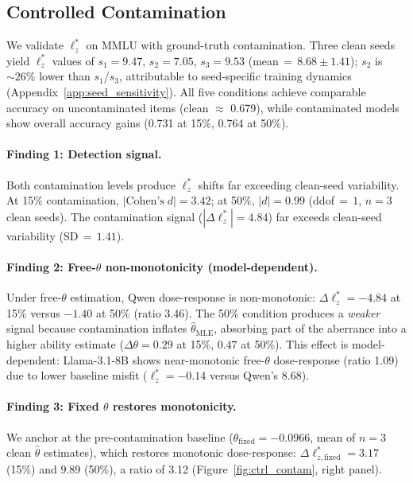 \subsection{Controlled Contamination}
\label{sec:ctrl_contam}

We validate $\ell_z^*$ on MMLU with ground-truth contamination.
Three clean seeds yield $\ell_z^*$ values of $s_1{=}9.47$, $s_2{=}7.05$, $s_3{=}9.53$ (mean$\,{=}\,8.68\pm1.41$); $s_2$ is ${\sim}26\%$ lower than $s_1$/$s_3$, attributable to seed-specific training dynamics (Appendix~\ref{app:seed_sensitivity}).
All five conditions achieve comparable accuracy on uncontaminated items (clean $\approx$ 0.679), while contaminated models show overall accuracy gains (0.731 at 15\%, 0.764 at 50\%).

\paragraph{Finding 1: Detection signal.}
Both contamination levels produce $\ell_z^*$ shifts far exceeding clean-seed variability.
At 15\% contamination, $|\text{Cohen's}\;d|{=}3.42$; at 50\%, $|d|{=}0.99$ (ddof$\,{=}\,1$, $n{=}3$ clean seeds).
The contamination signal ($|\Delta\ell_z^*|{=}4.84$) far exceeds clean-seed variability (SD$\,{=}\,1.41$).

\paragraph{Finding 2: Free-$\theta$ non-monotonicity (model-dependent).}
Under free-$\theta$ estimation, Qwen dose-response is non-monotonic: $\Delta\ell_z^*{=}{-}4.84$ at 15\% versus ${-}1.40$ at 50\% (ratio 3.46).
The 50\% condition produces a \emph{weaker} signal because contamination inflates $\hat{\theta}_{\text{MLE}}$, absorbing part of the aberrance into a higher ability estimate ($\Delta\theta{=}0.29$ at 15\%, $0.47$ at 50\%).
This effect is model-dependent: Llama-3.1-8B shows near-monotonic free-$\theta$ dose-response (ratio 1.09) due to lower baseline misfit ($\ell_z^*{=}{-}0.14$ versus Qwen's 8.68).

\paragraph{Finding 3: Fixed $\theta$ restores monotonicity.}
We anchor at the pre-contamination baseline ($\theta_{\text{fixed}}{=}{-}0.0966$, mean of $n{=}3$ clean $\hat{\theta}$ estimates), which restores monotonic dose-response: $\Delta\ell_{z,\text{fixed}}^*{=}3.17$ (15\%) and $9.89$ (50\%), a ratio of 3.12 (Figure~\ref{fig:ctrl_contam}, right panel).

